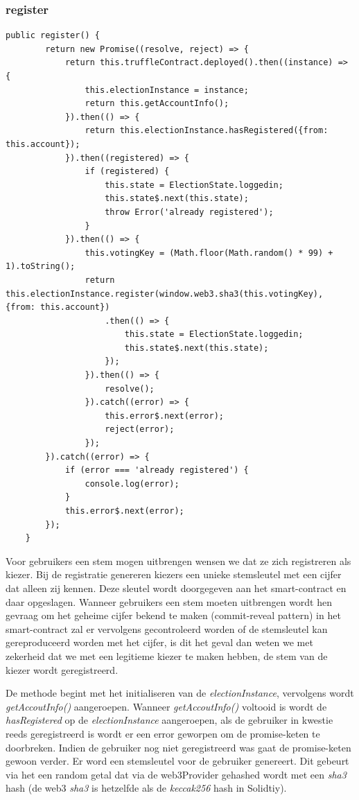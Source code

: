 	\subsubsection{register}
	\lstset{language=JavaScriptSolidity} 
	\begin{lstlisting}[numbers=none]
	public register() {
		return new Promise((resolve, reject) => {
			return this.truffleContract.deployed().then((instance) => {
				this.electionInstance = instance;
				return this.getAccountInfo();
			}).then(() => {
				return this.electionInstance.hasRegistered({from: this.account});
			}).then((registered) => {
				if (registered) {
					this.state = ElectionState.loggedin;
					this.state$.next(this.state);
					throw Error('already registered');
				}
			}).then(() => {
				this.votingKey = (Math.floor(Math.random() * 99) + 1).toString();
				return this.electionInstance.register(window.web3.sha3(this.votingKey), {from: this.account})
					.then(() => {
						this.state = ElectionState.loggedin;
						this.state$.next(this.state);
					});
				}).then(() => {
					resolve();
				}).catch((error) => {
					this.error$.next(error);
					reject(error);
				});
		}).catch((error) => {
			if (error === 'already registered') {
				console.log(error);
			}
			this.error$.next(error);
		});
	}
	\end{lstlisting}
		Voor gebruikers een stem mogen uitbrengen wensen we dat ze zich registreren als kiezer. Bij de registratie genereren kiezers een unieke stemsleutel met een cijfer dat alleen zij kennen. Deze sleutel wordt doorgegeven aan het smart-contract en daar opgeslagen. Wanneer gebruikers een stem moeten uitbrengen wordt hen gevraag om het geheime cijfer bekend te maken (commit-reveal pattern) in het smart-contract zal er vervolgens gecontroleerd worden of de stemsleutel kan gereproduceerd worden met het cijfer, is dit het geval dan weten we met zekerheid dat we met een legitieme kiezer te maken hebben, de stem van de kiezer wordt geregistreerd.
		
		De methode begint met het initialiseren van de \textit{electionInstance}, vervolgens wordt \textit{getAccoutInfo()} aangeroepen. Wanneer \textit{getAccoutInfo()} voltooid is wordt de \textit{hasRegistered} op de \textit{electionInstance} aangeroepen, als de gebruiker in kwestie reeds geregistreerd is wordt er een error geworpen om de promise-keten te doorbreken. Indien de gebruiker nog niet geregistreerd was gaat de promise-keten gewoon verder. Er word een stemsleutel voor de gebruiker genereert. Dit gebeurt via het een random getal dat via de web3Provider gehashed wordt met een \textit{sha3} hash (de web3 \textit{sha3} is hetzelfde als de \textit{keccak256} hash in Solidtiy).
		
